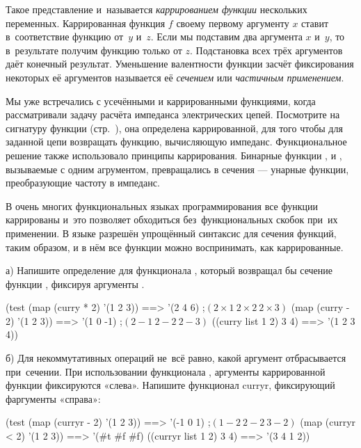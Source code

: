 Такое представление и~называется \emph{каррированием функции} нескольких переменных. Каррированная функция $f$ своему первому аргументу $x$ ставит в~соответствие функцию от~$y$ и~$z$. Если мы подставим два аргумента $x$ и~$y$, то в~результате получим функцию только от $z$. Подстановка всех трёх аргументов даёт конечный результат. Уменьшение валентности функции засчёт фиксирования некоторых её аргументов называется её \emph{сечением} или \emph{частичным применением}.

Мы уже встречались с усечёнными и каррированными функциями, когда рассматривали задачу расчёта импеданса электрических цепей. Посмотрите на сигнатуру функции  (стр.~\pageref{example:impedance}), она определена каррированной, для того чтобы для заданной цепи возвращать функцию, вычисляющую импеданс. Функциональное решение также использовало принципы каррирования. Бинарные функции ,  и , вызываемые с одним агрументом, превращались в сечения --- унарные функции, преобразующие частоту в импеданс.

\label{ML-notation}В очень многих функциональных языках программирования все функции каррированы и~это позволяет обходиться без~функциональных скобок при~их применении. В языке \Scheme разрешён упрощённый синтаксис для сечения функций, таким образом, и в нём все функции можно воспринимать, как каррированные.

\begin{Assignment}

  а) Напишите определение для функционала , который возвращал бы сечение функции , фиксируя аргументы . 

  \begin{Specification}
(test
  (map (curry * 2) '(1 2 3)) ==> '(2 4 6)  ;$(2\times1\ 2\times2\ 2\times3)$
  (map (curry - 2) '(1 2 3)) ==> '(1 0 -1) ;$(2-1\ 2-2\ 2-3)$
  ((curry list 1 2) 3 4)     ==> '(1 2 3 4))
  \end{Specification}

  б) Для некоммутативных операций не~всё равно, какой аргумент отбрасывается при~сечении. При использовании функционала , аргументы каррированной функции фиксируются «слева». Напишите функционал \si{curryr}, фиксирующий фаргументы «справа»: 

  \begin{Specification}
(test 
  (map (curryr - 2) '(1 2 3)) ==> '(-1 0 1)   ;$(1-2\ 2-2\ 3-2)$   
  (map (curryr < 2) '(1 2 3)) ==> '(#t #f #f)
  ((curryr list 1 2) 3 4)     ==> '(3 4 1 2))  
  \end{Specification}
\end{Assignment}

